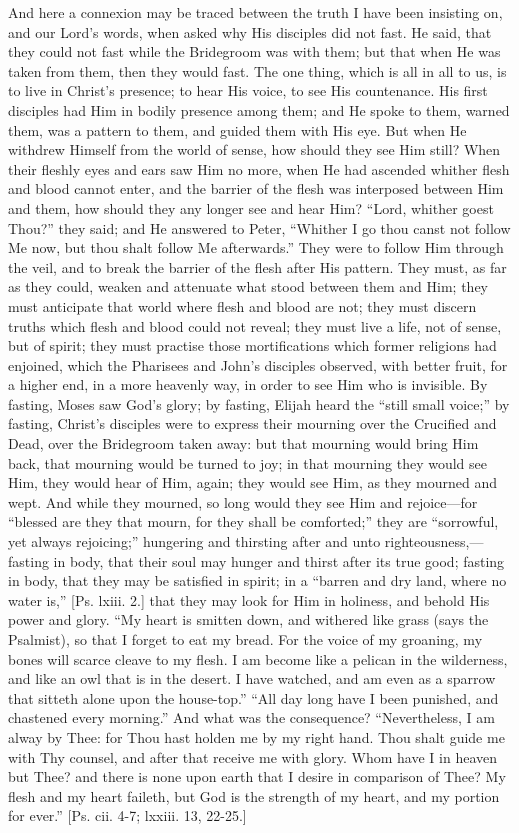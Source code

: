 And here a connexion may be traced between the truth I have been
insisting on, and our Lord's words, when asked why His disciples did not
fast. He said, that they could not fast while the Bridegroom was with
them; but that when He was taken from them, then they would fast. The
one thing, which is all in all to us, is to live in Christ's presence;
to hear His voice, to see His countenance. His first disciples had Him
in bodily presence among them; and He spoke to them, warned them, was a
pattern to them, and guided them with His eye. But when He withdrew
Himself from the world of sense, how should they see Him still? When
their fleshly eyes and ears saw Him no more, when He had ascended
whither flesh and blood cannot enter, and the barrier of the flesh was
interposed between Him and them, how should they any longer see and hear
Him? ``Lord, whither goest Thou?'' they said; and He answered to
Peter, ``Whither I go thou canst not follow Me now, but thou shalt
follow Me afterwards.'' They were to follow Him through the veil,
and to break the barrier of the flesh after His pattern. They must, as
far as they could, weaken and attenuate what stood between them and Him;
they must anticipate that world where flesh and blood are not; they must
discern truths which flesh and blood could not reveal; they must live a
life, not of sense, but of spirit; they must practise those
mortifications which former religions had enjoined, which the Pharisees
and John's disciples observed, with better fruit, for a higher end, in a
more heavenly way, in order to see Him who is invisible. By fasting,
Moses saw God's glory; by fasting, Elijah heard the ``still small
voice;'' by fasting, Christ's disciples were to express their
mourning over the Crucified and Dead, over the Bridegroom taken away:
but that mourning would bring Him back, that mourning would be turned to
joy; in that mourning they would see Him, they would hear of Him, again;
they would see Him, as they mourned and wept. And while they mourned, so
long would they see Him and rejoice—for ``blessed are they that
mourn, for they shall be comforted;'' they are ``sorrowful, yet
always rejoicing;'' hungering and thirsting after and unto
righteousness,—fasting in body, that their soul may hunger and thirst
after its true good; fasting in body, that they may be satisfied in
spirit; in a ``barren and dry land, where no water is,'' [Ps.
lxiii. 2.] that they may look for Him in holiness, and behold His power
and glory. ``My heart is smitten down, and withered like grass (says
the Psalmist), so that I forget to eat my bread. For the voice of my
groaning, my bones will scarce cleave to my flesh. I am become like a
pelican in the wilderness, and like an owl that is in the desert. I have
watched, and am even as a sparrow that sitteth alone upon the
house-top.'' ``All day long have I been punished, and chastened
every morning.'' And what was the consequence? ``Nevertheless, I
am alway by Thee: for Thou hast holden me by my right hand. Thou shalt
guide me with Thy counsel, and after that receive me with glory. Whom
have I in heaven but Thee? and there is none upon earth that I desire in
comparison of Thee? My flesh and my heart faileth, but God is the
strength of my heart, and my portion for ever.'' [Ps. cii. 4-7;
lxxiii. 13, 22-25.]

